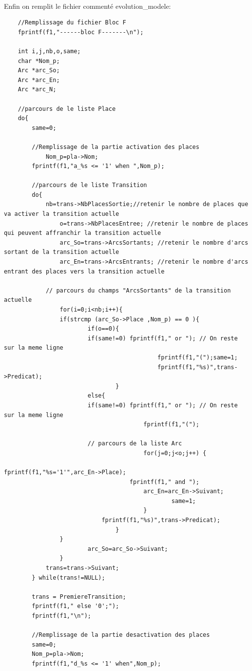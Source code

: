 \paragraph{} Enfin on remplit le fichier commenté evolution\_modele:
\begin{lstlisting}
	//Remplissage du fichier Bloc F
	fprintf(f1,"------bloc F-------\n");

	int i,j,nb,o,same;	
	char *Nom_p;
	Arc *arc_So;
	Arc *arc_En;
	Arc *arc_N;

	//parcours de le liste Place
	do{  
		same=0;
	
		//Remplissage de la partie activation des places 
        	Nom_p=pla->Nom;	
		fprintf(f1,"a_%s <= '1' when ",Nom_p);	

		//parcours de le liste Transition
 		do{
			nb=trans->NbPlacesSortie;//retenir le nombre de places que va activer la transition actuelle 
    			o=trans->NbPlacesEntree; //retenir le nombre de places qui peuvent affranchir la transition actuelle 
    			arc_So=trans->ArcsSortants; //retenir le nombre d'arcs sortant de la transition actuelle 
    			arc_En=trans->ArcsEntrants; //retenir le nombre d'arcs entrant des places vers la transition actuelle 
				
			// parcours du champs "ArcsSortants" de la transition actuelle
        	  	for(i=0;i<nb;i++){ 
				if(strcmp (arc_So->Place ,Nom_p) == 0 ){
			      		if(o==0){
						if(same!=0) fprintf(f1," or "); // On reste sur la meme ligne 
        	                              	fprintf(f1,"(");same=1;
        	                              	fprintf(f1,"%s)",trans->Predicat);
        	             		}
				        else{ 
						if(same!=0) fprintf(f1," or "); // On reste sur la meme ligne 
        	                        	fprintf(f1,"(");
						
						// parcours de la liste Arc
        	                        	for(j=0;j<o;j++) {
        	                          		fprintf(f1,"%s='1'",arc_En->Place);
				            		fprintf(f1," and ");
			                    		arc_En=arc_En->Suivant; 
        	                            		same=1;
        	                       	 	}
				        	fprintf(f1,"%s)",trans->Predicat);
        	              		} 			
			   	}
        	    		arc_So=arc_So->Suivant; 	     	
        	 	} 
 			trans=trans->Suivant;
 		} while(trans!=NULL);

 		trans = PremiereTransition;
		fprintf(f1," else '0';");
		fprintf(f1,"\n"); 

		//Remplissage de la partie desactivation des places 		
		same=0; 
		Nom_p=pla->Nom;	
		fprintf(f1,"d_%s <= '1' when",Nom_p);
		

\end{lstlisting}
